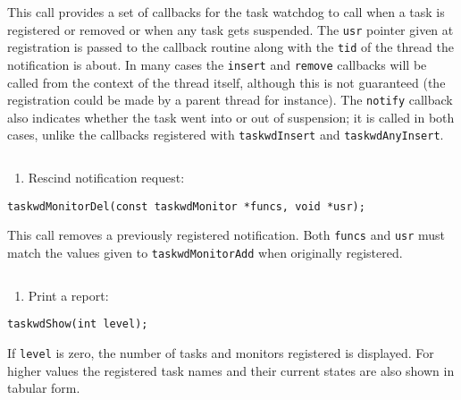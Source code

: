 \begin{description}\item This call provides a set of callbacks for the task watchdog to call when a task is registered or removed or when any 
task gets suspended. The \verb|usr| pointer given at registration is passed to the callback routine along with the \verb|tid| of 
the thread the notification is about. In many cases the \verb|insert| and \verb|remove| callbacks will be called from the 
context of the thread itself, although this is not guaranteed (the registration could be made by a parent thread for 
instance). The \verb|notify| callback also indicates whether the task went into or out of suspension; it is called in both 
cases, unlike the callbacks registered with \verb|taskwdInsert| and \verb|taskwdAnyInsert|.

\end{description}\begin{verbatim}
\end{verbatim}\begin{enumerate}\item Rescind notification request:

\end{enumerate}\begin{verbatim}
taskwdMonitorDel(const taskwdMonitor *funcs, void *usr);

\end{verbatim}\begin{description}\item This call removes a previously registered notification. Both \verb|funcs| and \verb|usr| must match the values given to 
\verb|taskwdMonitorAdd| when originally registered.

\end{description}\begin{verbatim}
\end{verbatim}\begin{enumerate}\item Print a report:

\end{enumerate}\begin{verbatim}
taskwdShow(int level);

\end{verbatim}\begin{description}\item If \verb|level| is zero, the number of tasks and monitors registered is displayed. For higher values the registered task 
names and their current states are also shown in tabular form.


\end{description}
